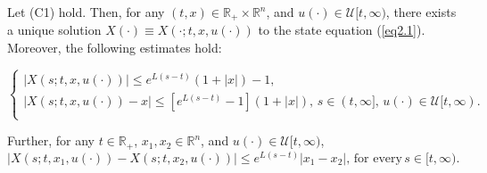 \begin{prop}\label{prop2.1.1}
	Let (C1) hold. Then, for any $(t,x)\in\mathbb{R}_{+}\times\mathbb{R}^n$, and $u(\cdot)\in \mathcal{U}[t,\infty)$, there exists a unique solution $X(\cdot)\equiv X(\cdot;t,x,u(\cdot))$ to the state equation (\ref{eq2.1}). Moreover, the following estimates hold:
	
	\begin{equation}\label{eq2.2}
	\left\{ \begin{array}{l}
	|X(s;t,x,u(\cdot))|\leq e^{L(s-t)}(1+|x|)-1, \\
	|X(s;t,x,u(\cdot))-x|\leq [e^{L(s-t)}-1](1+|x|),\, s\in (t,\infty],\, u(\cdot)\in \mathcal{U}[t,\infty).\\
	\end{array}
	\right.
	\end{equation} 
	
	Further, for any $t\in \mathbb{R}_{+}$, $x_1,x_2\in \mathbb{R}^n$, and $u(\cdot)\in \mathcal{U}[t,\infty)$,
	\begin{equation}\label{eq2.3}
	|X(s;t,x_1,u(\cdot))-X(s;t,x_2,u(\cdot))|\leq e^{L(s-t)}|x_1-x_2|,\,\mbox{for every}\, s\in [t,\infty).
	\end{equation}
\end{prop}

